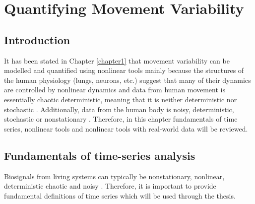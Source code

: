
\chapter{Quantifying Movement Variability} \label{chapter2}

%


\section{Introduction}


It has been stated in Chapter \ref{chapter1} that movement variability can 
be modelled
and quantified using nonlinear tools mainly because the structures of the 
human physiology (lungs, neurons, etc.) suggest that many of their dynamics 
are controlled by nonlinear dynamics \citep{goldberger1990}
and data from human movement is essentially chaotic deterministic, 
meaning that it is neither deterministic nor stochastic 
\citep{hatze1986, preatoni2010, preatoni2013, stergiou2006}. 
Additionally, data from the human body is noisy, deterministic, stochastic 
or nonstationary 
\citep{newell1998,stergiou2011, preatoni2010, preatoni2013,caballero2014}.
Therefore, in this chapter fundamentals of time series, nonlinear tools and
nonlinear tools with real-world data will be reviewed.



\section{Fundamentals of time-series analysis}
Biosignals from living systems can typically be nonstationary, nonlinear, 
deterministic chaotic and noisy \citep{klonowski2007, caballero2014, 
wijnants2009, gomezgarcia2014, stergiou2006, harbourne2009, stergiou2011,
hatze1986, newell1998}. Therefore, it is important to provide fundamental 
definitions of time series which will be used through the thesis.

